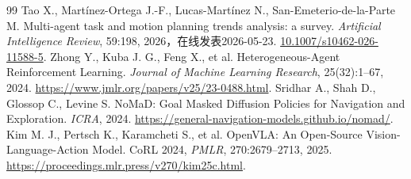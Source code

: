 \begin{thebibliography}{99}
 Tao X., Martínez-Ortega J.-F., Lucas-Martínez N., San-Emeterio-de-la-Parte M. Multi-agent task and motion planning trends analysis: a survey. \emph{Artificial Intelligence Review}, 59:198, 2026，在线发表2026-05-23. \href{https://doi.org/10.1007/s10462-026-11588-5}{10.1007/s10462-026-11588-5}.
 Zhong Y., Kuba J. G., Feng X., et al. Heterogeneous-Agent Reinforcement Learning. \emph{Journal of Machine Learning Research}, 25(32):1--67, 2024. \url{https://www.jmlr.org/papers/v25/23-0488.html}.
 Sridhar A., Shah D., Glossop C., Levine S. NoMaD: Goal Masked Diffusion Policies for Navigation and Exploration. \emph{ICRA}, 2024. \url{https://general-navigation-models.github.io/nomad/}.
 Kim M. J., Pertsch K., Karamcheti S., et al. OpenVLA: An Open-Source Vision-Language-Action Model. CoRL 2024, \emph{PMLR}, 270:2679--2713, 2025. \url{https://proceedings.mlr.press/v270/kim25c.html}.
\end{thebibliography}
